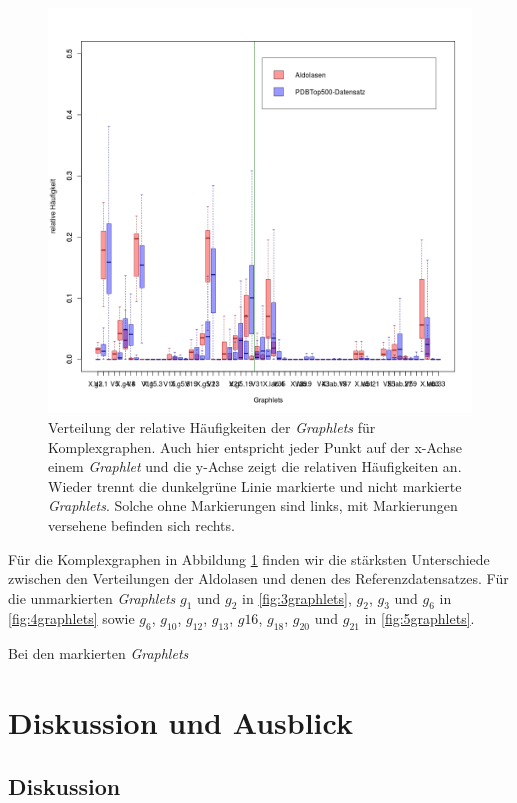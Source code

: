 \documentclass{report}
\begin{document}
\begin{figure}
\label{fig:cgplot}
\includegraphics[scale=0.55]{cg_plot.png}
\caption{Verteilung der relative H\"aufigkeiten der \textit{Graphlets} f\"ur Komplexgraphen. Auch hier entspricht jeder Punkt auf der x-Achse einem \textit{Graphlet} und die y-Achse zeigt die relativen H\"aufigkeiten an. Wieder trennt die dunkelgr\"une Linie markierte und nicht markierte \textit{Graphlets}. Solche ohne Markierungen sind links, mit Markierungen versehene befinden sich rechts.}
\end{figure}

F\"ur die Komplexgraphen in Abbildung \ref{fig:cgplot} finden wir die st\"arksten Unterschiede zwischen den Verteilungen der Aldolasen und denen des Referenzdatensatzes. F\"ur die unmarkierten \textit{Graphlets} $g_1$ und $g_2$ in \ref{fig:3graphlets}, $g_2$, $g_3$ und $g_6$ in \ref{fig:4graphlets} sowie $g_6$, $g_{10}$, $g_{12}$, $g_{13}$, $g{16}$, $g_{18}$, $g_{20}$ und $g_{21}$ in \ref{fig:5graphlets}.

Bei den markierten \textit{Graphlets}  

\chapter{Diskussion und Ausblick}



\section{Diskussion}
\end{document}
